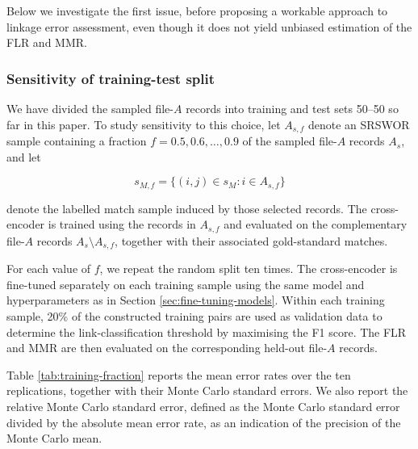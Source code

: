 Below we investigate the first issue, before proposing a workable approach to linkage error
assessment, even though it does not yield unbiased estimation of the FLR and MMR.


\subsubsection{Sensitivity of training-test split}
\label{sec:split-sensitivity}

We have divided the sampled file-$A$ records into training and test sets 50--50 so far
in this paper. To study sensitivity to this choice, let $A_{s,f}$ denote an SRSWOR sample
containing a fraction $f=0.5,0.6,\ldots,0.9$ of the sampled file-$A$ records $A_s$, and let

\[
s_{M,f}
=
\{(i,j)\in s_M:i\in A_{s,f}\}
\]

denote the labelled match sample induced by those selected records. The cross-encoder is
trained using the records in $A_{s,f}$ and evaluated on the complementary file-$A$ records
$A_s\setminus A_{s,f}$, together with their associated gold-standard matches.

For each value of $f$, we repeat the random split ten times. The cross-encoder is
fine-tuned separately on each training sample using the same model and hyperparameters
as in Section \ref{sec:fine-tuning-models}. Within each training sample, 20\% of the
constructed training pairs are used as validation data to determine the link-classification
threshold by maximising the F1 score. The FLR and MMR are then evaluated on the
corresponding held-out file-$A$ records.

Table \ref{tab:training-fraction} reports the mean error rates over the ten replications,
together with their Monte Carlo standard errors. We also report the relative Monte Carlo
standard error, defined as the Monte Carlo standard error divided by the absolute mean
error rate, as an indication of the precision of the Monte Carlo mean.

